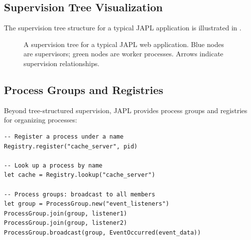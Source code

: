 \documentclass[11pt,a4paper]{article}
\begin{document}
\subsection{Supervision Tree Visualization}

The supervision tree structure for a typical JAPL application is illustrated in .

\begin{figure}[H]
\centering
{}
\caption{A supervision tree for a typical JAPL web application. Blue nodes are supervisors; green nodes are worker processes. Arrows indicate supervision relationships.}
\label{fig:suptree}
\end{figure}

\subsection{Process Groups and Registries}

Beyond tree-structured supervision, JAPL provides process groups and registries for organizing processes:

\begin{lstlisting}[language=japl,caption={Process groups and registries}]
-- Register a process under a name
Registry.register("cache_server", pid)

-- Look up a process by name
let cache = Registry.lookup("cache_server")

-- Process groups: broadcast to all members
let group = ProcessGroup.new("event_listeners")
ProcessGroup.join(group, listener1)
ProcessGroup.join(group, listener2)
ProcessGroup.broadcast(group, EventOccurred(event_data))
\end{lstlisting}
\end{document}
